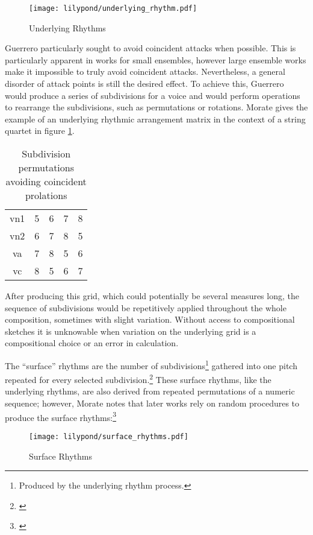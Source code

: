\begin{figure}[H]
    \texttt{[image: lilypond/underlying\_rhythm.pdf]}
    \caption{Underlying Rhythms}
    \label{fig:underlying}
\end{figure}

Guerrero particularly sought to avoid coincident attacks when possible. This is particularly apparent in works for small ensembles, however large ensemble works make it impossible to truly avoid coincident attacks. Nevertheless, a general disorder of attack points is still the desired effect. To achieve this, Guerrero would produce a series of subdivisions for a voice and would perform operations to rearrange the subdivisions, such as permutations or rotations. Morate gives the example of an underlying rhythmic arrangement matrix in the context of a string quartet in figure \ref{fig:underlyin-permutations}.

\begin{table}[H]
    \centering
    \begin{tabular}{ c | c c c c } 
vn1 & 5 & 6 & 7 & 8\\
vn2 & 6 & 7 & 8 & 5\\
va & 7 & 8 & 5 & 6\\
vc & 8 & 5 & 6 & 7
\end{tabular}
    \caption{Subdivision permutations avoiding coincident prolations}
    \label{fig:underlyin-permutations}
\end{table}

After producing this grid, which could potentially be several measures long, the sequence of subdivisions would be repetitively applied throughout the whole composition, sometimes with slight variation. Without access to compositional sketches it is unknowable when variation on the underlying grid is a compositional choice or an error in calculation.

The ``surface'' rhythms are the number of subdivisions\footnote{Produced by the underlying rhythm process.} gathered into one pitch repeated for every selected subdivision.\footnote{\citet[155]{guerreropaper}} These surface rhythms, like the underlying rhythms, are also derived from repeated permutations of a numeric sequence; however, Morate notes that later works rely on random procedures to produce the surface rhythms:\footnote{\citet[216]{guerreropaper}}

\begin{figure}[H]
    \texttt{[image: lilypond/surface\_rhythms.pdf]}
    \caption{Surface Rhythms}
    \label{fig:surface}
\end{figure}

